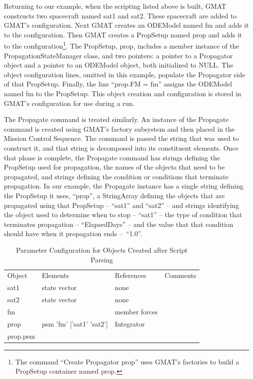Returning to our example, when the scripting listed above is built, GMAT constructs two spacecraft
named sat1 and sat2.  These spacecraft are added to GMAT's configuration.  Next GMAT creates an
ODEModel named fm and adds it to the configuration.  Then GMAT creates a PropSetup named prop and
 adds it to the configuration\footnote{The command ``Create Propagator prop'' uses GMAT's factories
to build a PropSetup container named prop.}.  The PropSetup, prop, includes a member instance of the
PropagationStateManager class, and two pointers: a pointer to a Propagator object and a pointer to
an ODEModel object, both initialized to NULL.  The object configuration lines, omitted in this
example, populate the Propagator side of that PropSetup.  Finally, the line ``prop.FM = fm''
assigns the ODEModel named fm to the PropSetup.  This object creation and configuration is stored
in GMAT's configuration for use during a run.

The Propagate command is treated similarly.  An instance of the Propagate command is created using
GMAT's factory subsystem and then placed in the Mission Control Sequence.  The command is passed
the string that was used to construct it, and that string is decomposed into its constituent
elements.  Once that phase is complete, the Propagate command has strings defining the PropSetup
used for propagation, the names of the objects that need to be propagated, and strings defining the
condition or conditions that terminate propagation.  In our example, the Propagate instance has a
single string defining the PropSetup it uses, ``prop'', a StringArray defining the objects that are
propagated using that PropSetup -- ``sat1'' and ``sat2'' -- and strings identifying the object used
to determine when to stop -- ``sat1'' -- the type of condition that terminates propagation --
``ElapsedDays'' -- and the value that that condition should have when it propagation ends
--~``1.0''.

\begin{table}
\begin{center}
\begin{tabular}{llll}
Object & Elements & References & Comments \\
sat1 & state vector & none &  \\
sat2 & state vector & none &  \\
fm &  & member forces &  \\
prop & psm 'fm' ['sat1' 'sat2'] & Integrator &  \\
prop.psm &  &  &
\end{tabular}
\caption[Parameter Configuration after Parsing]{Parameter Configuration for Objects Created after
Script Parsing}
\end{center}
\end{table}
